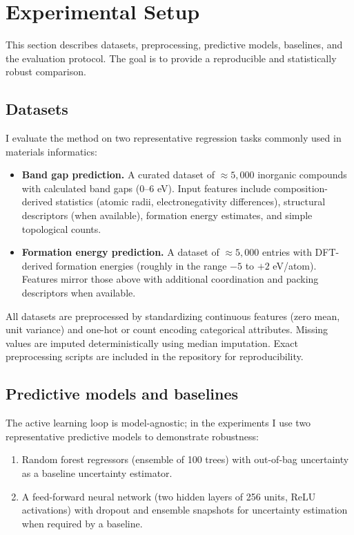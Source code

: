 \documentclass{article}
\begin{document}
\section{Experimental Setup}
\label{sec:exp}

This section describes datasets, preprocessing, predictive models, baselines, and the evaluation protocol. The goal is to provide a reproducible and statistically robust comparison.

\subsection{Datasets}

I evaluate the method on two representative regression tasks commonly used in materials informatics:
\begin{itemize}
    \item \textbf{Band gap prediction.} A curated dataset of $\approx 5{,}000$ inorganic compounds with calculated band gaps (0–6 eV). Input features include composition-derived statistics (atomic radii, electronegativity differences), structural descriptors (when available), formation energy estimates, and simple topological counts.
    \item \textbf{Formation energy prediction.} A dataset of $\approx 5{,}000$ entries with DFT-derived formation energies (roughly in the range $-5$ to $+2$ eV/atom). Features mirror those above with additional coordination and packing descriptors when available.
\end{itemize}

All datasets are preprocessed by standardizing continuous features (zero mean, unit variance) and one-hot or count encoding categorical attributes. Missing values are imputed deterministically using median imputation. Exact preprocessing scripts are included in the repository for reproducibility.

\subsection{Predictive models and baselines}

The active learning loop is model-agnostic; in the experiments I use two representative predictive models to demonstrate robustness:
\begin{enumerate}
    \item Random forest regressors (ensemble of 100 trees) with out-of-bag uncertainty as a baseline uncertainty estimator.
    \item A feed-forward neural network (two hidden layers of 256 units, ReLU activations) with dropout and ensemble snapshots for uncertainty estimation when required by a baseline.
\end{enumerate}
\end{document}
